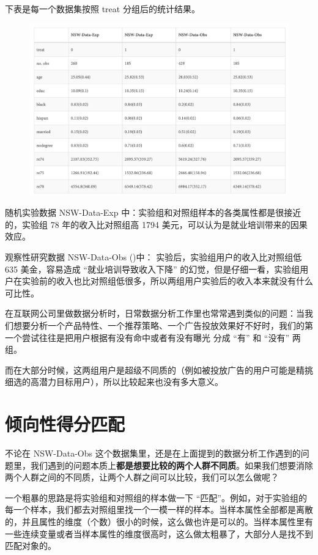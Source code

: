 \documentclass[12pt]{article}
\begin{document}
下表是每一个数据集按照 treat 分组后的统计结果。
\begin{figure}[H]
    \centering
    \includegraphics[width=1\textwidth]{fig/CasualInference-NSW-Data.png}
\end{figure}

随机实验数据 NSW-Data-Exp 中：实验组和对照组样本的各类属性都是很接近的，实验组 78 年的收入比对照组高 1794 美元，可以认为是就业培训带来的因果效应。

观察性研究数据 NSW-Data-Obs ()中： 实验后，实验组用户的收入比对照组低 635 美金，容易造成 “就业培训导致收入下降” 的幻觉，但是仔细一看，实验组用户在实验前的收入也比对照组低很多，所以两组用户实验后的收入本来就没有什么可比性。

在互联网公司里做数据分析时，日常数据分析工作里也常常遇到类似的问题：当我们想要分析一个产品特性、一个推荐策略、一个广告投放效果好不好时，我们的第一个尝试往往是把用户根据有没有命中或者有没有曝光 分成 “有” 和 “没有” 两组。

而在大部分时候，这两组用户是超级不同质的（例如被投放广告的用户可能是精挑细选的高潜力目标用户），所以比较起来也没有多大意义。

\section{倾向性得分匹配}
不论在 NSW-Data-Obs 这个数据集里，还是在上面提到的数据分析工作遇到的问题里，我们遇到的问题本质上\textbf{都是想要比较的两个人群不同质}。如果我们想要消除两个人群之间的不同质，让两个人群之间可以比较，我们可以怎么做呢？

一个粗暴的思路是将实验组和对照组的样本做一下 “匹配”。例如，对于实验组的每一个样本，我们都去对照组里找一个一模一样的样本。当样本属性全部都是离散的，并且属性的维度（个数）很小的时候，这么做也许是可以的。当样本属性里有一些连续变量或者当样本属性的维度很高时，这么做太粗暴了，大部分人是找不到匹配对象的。
\end{document}
